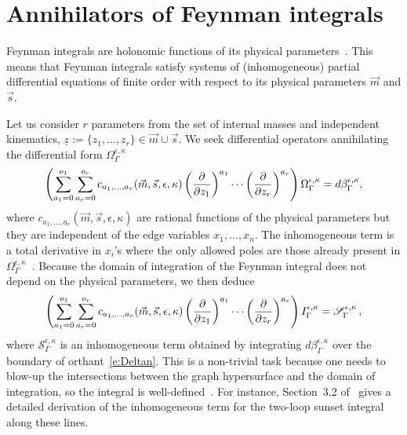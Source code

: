 \documentclass[a4paper,12pt]{article}
\numberwithin{equation}{section}
\numberwithin{figure}{section}
\begin{document}
\section{Annihilators of Feynman integrals}
\label{sec:Red}
Feynman integrals are holonomic functions of its physical parameters~\cite{Kashiwara:1977nf, Bitoun:2017nre, Smirnov:2010hn,Lee:2013hzt}. This means that Feynman integrals satisfy systems of  (inhomogeneous) partial
differential equations of finite order with respect to its physical
parameters $\vec m$ and $\vec s$.

Let us consider $r$ parameters from the set of internal masses and independent kinematics, $\underline z:=\{z_1,\dots,z_r\} \in \vec m \cup \vec s $. 
%
We seek 
differential operators 
annihilating the differential form $\Omega_\Gamma^{\epsilon,\kappa}$ 
\begin{equation}\label{e:PFOmegaGeneric}
	\left(  \sum_{a_1=0}^{o_1} \sum_{ a_r=0}^{o_r} c_{a_1,\dots,a_r}(\vec m,\vec s,\epsilon,\kappa)\left(\partial\over \partial z_1\right)^{a_1}\cdots\left(\partial
	\over\partial z_r\right)^{a_r}  \right)\Omega_\Gamma^{\epsilon,\kappa}=d\beta^{\epsilon,\kappa}_\Gamma,
\end{equation}
where $c_{a_1,\dots,a_r}(\vec m,\vec s,\epsilon,\kappa)$ are rational functions of the physical
parameters but they are independent of the edge variables $x_1,\dots,x_n$. The inhomogeneous term is a total derivative in $x_i$'s where the only allowed poles are those already present in $\Omega_\Gamma^{\epsilon,\kappa}$~\cite{Lairez:2022zkj}.
%
Because the domain of integration of the Feynman integral does not
depend on the physical parameters, we then deduce
\begin{equation}\label{e:PDEintFeynman}
	\left( \sum_{a_1=0}^{o_1} \sum_{ a_r=0}^{o_r} c_{a_1,\dots,a_r}(\vec m,\vec s,\epsilon,\kappa)\left(\partial\over \partial z_1\right)^{a_1}\cdots\left(\partial
	\over\partial z_r\right)^{a_r}  \right)I^{\epsilon,\kappa}_\Gamma=\mathscr{S}^{\epsilon,\kappa}_\Gamma \, ,
\end{equation}
where $\mathscr{S}^{\epsilon,\kappa}_\Gamma$ is an inhomogeneous term obtained by
integrating $d\beta^{\epsilon,\kappa}_\Gamma$ over the boundary of
orthant~\eqref{e:Deltan}. This is a non-trivial task because one needs
to blow-up the intersections between the graph hypersurface and the
domain of integration, so the integral is well-defined~\cite{bek,Brown:2009ta,Bloch:2016izu,muller2014picard}. For
instance, 
Section~3.2 of~\cite{Bloch:2016izu} gives  a detailed derivation of the inhomogeneous term for
the two-loop sunset integral along these lines.
\end{document}
